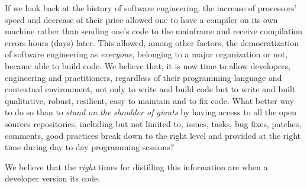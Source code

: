 \documentclass[11pt,a4paper, cuthesis]{report}
\begin{document}
If we look back at the history of software engineering, the increase of processors' speed and decrease of their price allowed one to have a compiler on its own machine rather than sending one's code to the mainframe and receive compilation errors hours (days) later. This allowed, among other factors, the democratization of software engineering as {\it everyone}, belonging to a major organization or not, became able to build code. We believe that, it is now time to allow developers, engineering and practitioners, regardless of their programming language and contextual environment, not only to write and build code but to write and built qualitative, robust, resilient, easy to maintain and to fix code. What better way to do so than to {\it stand on the shoulder of giants} by having access to all the open sources repositories, including but not limited to, issues, tasks, bug fixes, patches, comments, good practices break down to the right level and provided at the right time during day to day programming sessions?

We believe that the {\it right} times for distilling this information are when a developer version its code.





\end{document}
